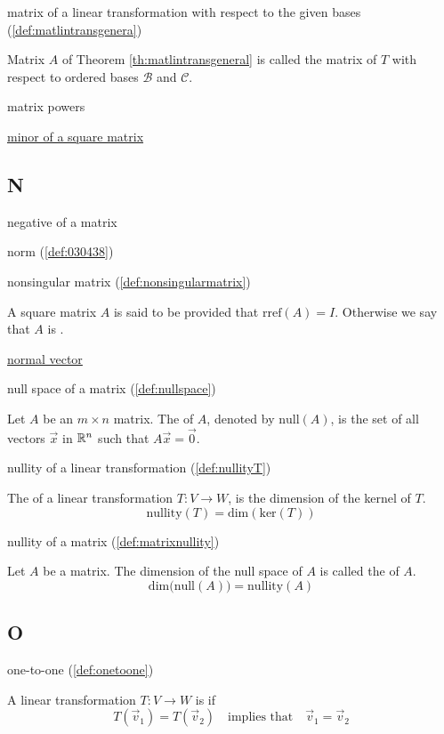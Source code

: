 \documentclass{ximera}
\begin{document}
matrix of a linear transformation with respect to the given bases (\ref{def:matlintransgenera})
\begin{expandable}
    Matrix $A$ of Theorem \ref{th:matlintransgeneral} is called the matrix of $T$ with respect to ordered bases $\mathcal{B}$ and $\mathcal{C}$.
\end{expandable}

matrix powers

\href{https://ximera.osu.edu/oerlinalg/LinearAlgebra/DET-0010/main}{minor of a square matrix}

\subsection{N}

negative of a matrix

norm (\ref{def:030438})


nonsingular matrix (\ref{def:nonsingularmatrix})
\begin{expandable}
    A square matrix $A$ is said to be  provided that $\mbox{rref}(A)=I$.  Otherwise we say that $A$ is .
\end{expandable}

\href{https://ximera.osu.edu/oerlinalg/LinearAlgebra/RRN-0030/main}{normal vector}

null space of a matrix (\ref{def:nullspace})
\begin{expandable}
    Let $A$ be an $m\times n$ matrix.  The  of $A$, denoted by $\mbox{null}(A)$, is the set of all vectors $\vec{x}$ in $\mathbb{R}^n$ such that $A\vec{x}=\vec{0}$.
\end{expandable}

nullity of a linear transformation (\ref{def:nullityT})
\begin{expandable}
    The  of a linear transformation $T:V\rightarrow W$, is the dimension of the kernel of $T$.
$$\mbox{nullity}(T)=\mbox{dim}(\mbox{ker}(T))$$
\end{expandable}

nullity of a matrix (\ref{def:matrixnullity})
\begin{expandable}
    Let $A$ be a matrix.  The dimension of the null space of $A$ is called the  of $A$.
$$\mbox{dim}\Big(\mbox{null}(A)\Big)=\mbox{nullity}(A)$$
\end{expandable}


\subsection{O}
one-to-one (\ref{def:onetoone})
\begin{expandable}
    A linear transformation $T:V\rightarrow W$ is  if 
$$T(\vec{v}_1)=T(\vec{v}_2)\quad \text{implies that}\quad \vec{v}_1=\vec{v}_2$$
\end{expandable}
\end{document}
